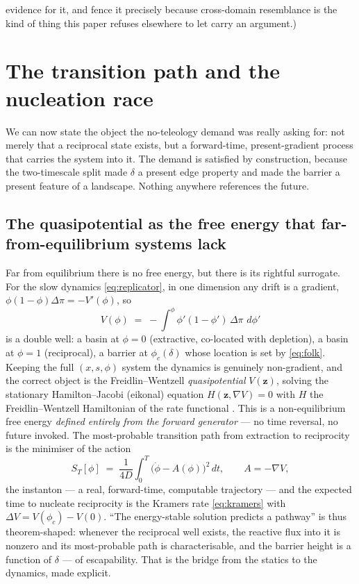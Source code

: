 \documentclass[11pt]{article}
\theoremstyle{plain}
\theoremstyle{definition}
\begin{document}
evidence for it, and fence it precisely because cross-domain resemblance is the kind of thing this paper refuses elsewhere to let carry an argument.)

\section{The transition path and the nucleation race}
\label{sec:nucleation}

We can now state the object the no-teleology demand was really asking for: not merely that a reciprocal state exists, but a forward-time, present-gradient process that carries the system into it. The demand is satisfied by construction, because the two-timescale split made $\delta$ a present edge property and made the barrier a present feature of a landscape. Nothing anywhere references the future.

\subsection{The quasipotential as the free energy that far-from-equilibrium systems lack}

Far from equilibrium there is no free energy, but there is its rightful surrogate. For the slow dynamics \eqref{eq:replicator}, in one dimension any drift is a gradient, $\phi(1-\phi)\Delta\pi = -V'(\phi)$, so
\begin{equation}
V(\phi) \;=\; -\!\int^{\phi}\!\!\phi'(1-\phi')\,\Delta\pi\,\,d\phi'
\label{eq:1dpot}
\end{equation}
is a double well: a basin at $\phi = 0$ (extractive, co-located with depletion), a basin at $\phi = 1$ (reciprocal), a barrier at $\phi_c(\delta)$ whose location is set by \eqref{eq:folk}. Keeping the full $(x,s,\phi)$ system the dynamics is genuinely non-gradient, and the correct object is the Freidlin--Wentzell \emph{quasipotential} $V(\mathbf z)$, solving the stationary Hamilton--Jacobi (eikonal) equation $H(\mathbf z, \nabla V) = 0$ with $H$ the Freidlin--Wentzell Hamiltonian of the rate functional \cite{freidlinwentzell,kramers1940}. This is a non-equilibrium free energy \emph{defined entirely from the forward generator} --- no time reversal, no future invoked. The most-probable transition path from extraction to reciprocity is the minimiser of the action
\begin{equation}
S_T[\phi] \;=\; \frac{1}{4D}\int_0^T \big(\dot\phi - A(\phi)\big)^2\,dt, \qquad A = -\nabla V,
\label{eq:action}
\end{equation}
the instanton --- a real, forward-time, computable trajectory --- and the expected time to nucleate reciprocity is the Kramers rate \eqref{eq:kramers} with $\Delta V = V(\phi_c) - V(0)$. ``The energy-stable solution predicts a pathway'' is thus theorem-shaped: whenever the reciprocal well exists, the reactive flux into it is nonzero and its most-probable path is characterisable, and the barrier height is a function of $\delta$ --- of escapability. That is the bridge from the statics to the dynamics, made explicit.
\end{document}
